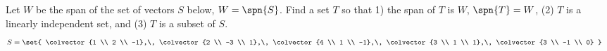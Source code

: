 Let $W$ be the span of the set of vectors $S$ below, $W=\spn{S}$.  Find a set $T$ so that 1) the span of $T$ is $W$, $\spn{T}=W$, (2) $T$ is a linearly independent set, and (3) $T$ is a subset of $S$.
%
\begin{align*}
S&=
\set{
\colvector{1 \\ 2 \\ -1},\,
\colvector{2 \\ -3 \\ 1},\,
\colvector{4 \\ 1 \\ -1},\,
\colvector{3 \\ 1 \\ 1},\,
\colvector{3 \\ -1 \\ 0}
}
\end{align*}